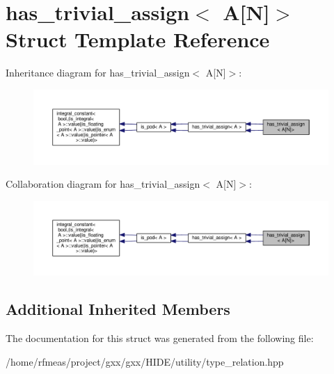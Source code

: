 \hypertarget{structhas__trivial__assign_3_01A[N]_4}{}\section{has\+\_\+trivial\+\_\+assign$<$ A\mbox{[}N\mbox{]}$>$ Struct Template Reference}
\label{structhas__trivial__assign_3_01A[N]_4}


Inheritance diagram for has\+\_\+trivial\+\_\+assign$<$ A\mbox{[}N\mbox{]}$>$\+:
\nopagebreak
\begin{figure}[H]
\begin{center}
\leavevmode
\includegraphics[width=350pt]{structhas__trivial__assign_3_01A[N]_4__inherit__graph}
\end{center}
\end{figure}


Collaboration diagram for has\+\_\+trivial\+\_\+assign$<$ A\mbox{[}N\mbox{]}$>$\+:
\nopagebreak
\begin{figure}[H]
\begin{center}
\leavevmode
\includegraphics[width=350pt]{structhas__trivial__assign_3_01A[N]_4__coll__graph}
\end{center}
\end{figure}
\subsection*{Additional Inherited Members}


The documentation for this struct was generated from the following file\+:\begin{DoxyCompactItemize}
\item 
/home/rfmeas/project/gxx/gxx/\+H\+I\+D\+E/utility/type\+\_\+relation.\+hpp\end{DoxyCompactItemize}

